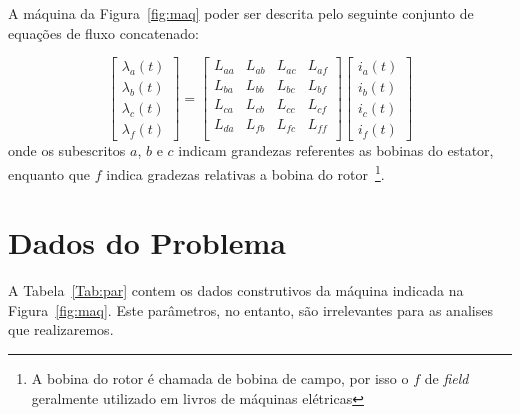 \documentclass[a4paper]{article}
\theoremstyle{definition}
\theoremstyle{plain}
\begin{document}
A máquina da Figura~\ref{fig:maq} poder ser descrita pelo seguinte conjunto de equações de fluxo concatenado:


\begin{equation}
\begin{bmatrix}
\lambda_a(t)\\[5pt]
\lambda_b(t)\\[5pt]
\lambda_c(t)\\[5pt]
\lambda_f(t)
\end{bmatrix} =
\begin{bmatrix}
L_{aa} & L_{ab} & L_{ac} & L_{af}\\[5pt]
L_{ba} & L_{bb} & L_{bc} & L_{bf}\\[5pt]
L_{ca} & L_{cb} & L_{cc} & L_{cf}\\[5pt]
L_{da} & L_{fb} & L_{fc} & L_{ff}\\[5pt]
\end{bmatrix}
\begin{bmatrix}
i_a(t)\\[5pt]
i_b(t)\\[5pt]
i_c(t)\\[5pt]
i_f(t)
\end{bmatrix}
\end{equation}
%
onde os subescritos $a$, $b$ e $c$ indicam grandezas referentes as bobinas do estator, enquanto que $f$ indica gradezas relativas a bobina do rotor~\footnote{A bobina do rotor é chamada de bobina de campo, por isso o $f$ de {\it field} geralmente utilizado em livros de máquinas elétricas}.




\section{Dados do Problema}

A Tabela~\ref{Tab:par} contem os dados construtivos da máquina indicada na Figura~\ref{fig:maq}. Este parâmetros, no entanto, são irrelevantes para as analises que realizaremos.  
\end{document}
